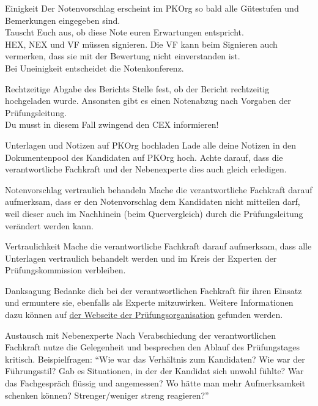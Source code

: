 \begin{taskitemwithoutcomment}{Einigkeit}
  Der Notenvorschlag erscheint im PKOrg so bald alle Gütestufen und Bemerkungen eingegeben sind.\\Tauscht Euch aus, ob diese Note euren Erwartungen entspricht.\\HEX, NEX und VF müssen signieren. Die VF kann beim Signieren auch vermerken, dass sie mit der Bewertung nicht einverstanden ist.\\Bei Uneinigkeit entscheidet die Notenkonferenz.
\end{taskitemwithoutcomment}
\begin{taskitem}{Rechtzeitige Abgabe des Berichts}
  Stelle fest, ob der Bericht rechtzeitig hochgeladen wurde. Ansonsten gibt es einen Notenabzug nach Vorgaben der Prüfungsleitung.\\Du musst in diesem Fall zwingend den CEX informieren!
\end{taskitem}
\newpage
\begin{taskitemwithoutcomment}{Unterlagen und Notizen auf PKOrg hochladen}
  Lade alle deine Notizen in den Dokumentenpool des Kandidaten auf PKOrg hoch. Achte darauf, dass die verantwortliche Fachkraft und der Nebenexperte dies auch gleich erledigen.
\end{taskitemwithoutcomment}
\begin{taskitemwithoutcomment}{Notenvorschlag vertraulich behandeln}
  Mache die verantwortliche Fachkraft darauf aufmerksam, dass er den Notenvorschlag dem Kandidaten nicht mitteilen darf, weil dieser auch im Nachhinein (beim Quervergleich) durch die Prüfungsleitung verändert werden kann.
\end{taskitemwithoutcomment}
\begin{taskitemwithoutcomment}{Vertraulichkeit}
  Mache die verantwortliche Fachkraft darauf aufmerksam, dass alle Unterlagen vertraulich behandelt werden und im Kreis der Experten der Prüfungskommission verbleiben.
\end{taskitemwithoutcomment}
\begin{taskitemwithoutcomment}{Danksagung}
  Bedanke dich bei der verantwortlichen Fachkraft für ihren Einsatz und ermuntere sie, ebenfalls als Experte mitzuwirken. Weitere Informationen dazu können auf \href{https://pk19.ch}{der Webseite der Prüfungsorganisation} gefunden werden.
\end{taskitemwithoutcomment}
\begin{taskitem}{Austausch mit Nebenexperte}
  Nach Verabschiedung der verantwortlichen Fachkraft nutze die Gelegenheit und besprechen den Ablauf des Prüfungstages kritisch. Beispielfragen: \enquote{Wie war das Verhältnis zum Kandidaten? Wie war der Führungsstil? Gab es Situationen, in der der Kandidat sich unwohl fühlte? War das Fachgespräch flüssig und angemessen? Wo hätte man mehr Aufmerksamkeit schenken können? Strenger/weniger streng reagieren?}
\end{taskitem}
